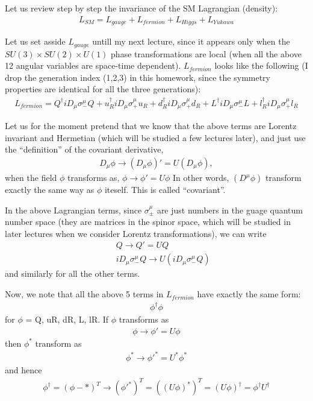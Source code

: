 \documentclass[12pt]{article}
\begin{document}
  Let us review step by step the invariance of the
  SM Lagrangian (density):
\begin{eqnarray}
    L_{SM}   =   L_{gauge} + L_{fermion} + L_{Higgs} + L_{Yukawa}
\end{eqnarray}

  Let us set asside $L_{gauge}$ untill my next lecture,
  since it appears only when the $SU(3)\times SU(2)\times U(1)$
  phase transformations are local (when all the above 12
  angular variables are space-time dependent).
  $L_{fermion}$ looks like the following (I drop the
  generation index (1,2,3) in this homework, since
  the symmetry properties are identical for all
  the three generations):
\begin{eqnarray}
    L_{fermion}
   = Q^\dagger  iD_\mu \sigma_-^\mu Q
   + u_R^\dagger iD_\mu \sigma_+^\mu u_R
   + d_R^\dagger iD_\mu \sigma_+^\mu d_R
   + L^\dagger  iD_\mu \sigma_-^\mu L
   + l_R^\dagger iD_\mu \sigma_+^\mu l_R
\end{eqnarray}
   
  Let us for the moment pretend that we know that
  the above terms are Lorentz invariant and Hermetian
  (which will be studied a few lectures later), and
  just use the ``definition'' of the covariant derivative,
\begin{eqnarray}
    D_\mu \phi \to (D_\mu \phi)' = U (D_\mu \phi),
\end{eqnarray}
  when the field $\phi$ transforms as,
 $\phi \to \phi' = U \phi$
  In other words, $(D^\mu \phi)$ transform exactly
  the same way as $\phi$ iteself.  This is called
  ``covariant''.

  In the above Lagrangian terms, since $\sigma_\pm^\mu$ are
  just numbers in the guage quantum number space (they
  are matrices in the spinor space, which will be studied
  in later lectures when we consider Lorentz transformations),
  we can write
\begin{eqnarray}
    &&Q \to Q' = UQ \\
    &&iD_\mu \sigma_-^\mu Q \to U (iD_\mu \sigma_-^\mu Q)
  \end{eqnarray}
   and similarly for all the other terms.

  Now, we note that all the above 5 terms in
  $L_{fermion}$ have exactly the same form:
\begin{eqnarray}
    \phi^\dagger \phi
\end{eqnarray}
  for $\phi$ = Q, uR, dR, L, lR.  If $\phi$ transforms as
\begin{eqnarray}
    \phi \to \phi' = U \phi
\end{eqnarray}
   then $\phi^*$ transform as
\begin{eqnarray}
    \phi^* \to \phi'^* = U^* \phi^*
\end{eqnarray}
   and hence
   \begin{eqnarray}
    \phi^\dagger = (\phi-*)^T   \to
    ({\phi'}^*)^T = ((U \phi)^*)^T
    =
    (U \phi)^\dagger
    =
    \phi^\dagger U^\dagger
   \end{eqnarray}
  
\end{document}
